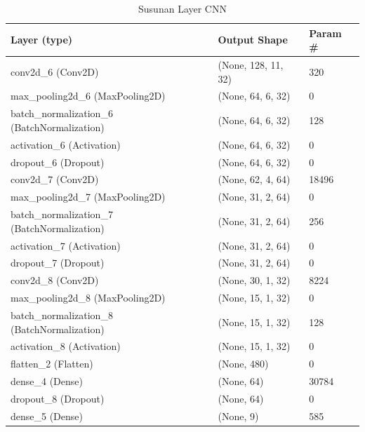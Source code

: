 \begin{table}[h]
	\centering
	
	\caption{Susunan Layer CNN}
	
	\begin{tabular}{|l|l|l|}
		\hline
		\textbf{Layer (type)}                        & \textbf{Output Shape} & \textbf{Param \#} \\ \hline
		conv2d\_6 (Conv2D)                           & (None, 128, 11, 32)   & 320               \\ \hline
		max\_pooling2d\_6 (MaxPooling2D)             & (None, 64, 6, 32)     & 0                 \\ \hline
		batch\_normalization\_6 (BatchNormalization) & (None, 64, 6, 32)     & 128               \\ \hline
		activation\_6 (Activation)                   & (None, 64, 6, 32)     & 0                 \\ \hline
		dropout\_6 (Dropout)                         & (None, 64, 6, 32)     & 0                 \\ \hline
		conv2d\_7 (Conv2D)                           & (None, 62, 4, 64)     & 18496             \\ \hline
		max\_pooling2d\_7 (MaxPooling2D)             & (None, 31, 2, 64)     & 0                 \\ \hline
		batch\_normalization\_7 (BatchNormalization) & (None, 31, 2, 64)     & 256               \\ \hline
		activation\_7 (Activation)                   & (None, 31, 2, 64)     & 0                 \\ \hline
		dropout\_7 (Dropout)                         & (None, 31, 2, 64)     & 0                 \\ \hline
		conv2d\_8 (Conv2D)                           & (None, 30, 1, 32)     & 8224              \\ \hline
		max\_pooling2d\_8 (MaxPooling2D)             & (None, 15, 1, 32)     & 0                 \\ \hline
		batch\_normalization\_8 (BatchNormalization) & (None, 15, 1, 32)     & 128               \\ \hline
		activation\_8 (Activation)                   & (None, 15, 1, 32)     & 0                 \\ \hline
		flatten\_2 (Flatten)                         & (None, 480)           & 0                 \\ \hline
		dense\_4 (Dense)                             & (None, 64)            & 30784             \\ \hline
		dropout\_8 (Dropout)                         & (None, 64)            & 0                 \\ \hline
		dense\_5 (Dense)                             & (None, 9)             & 585               \\ \hline
	\end{tabular}

	\label{fig:layercnn}
\end{table}

